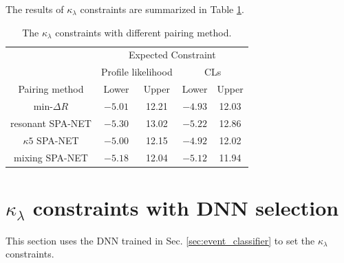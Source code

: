 \documentclass[12pt]{article}
\begin{document}
		The results of $\kappa_\lambda$ constraints are summarized in Table \ref{tab:kappa_constraint2}.
		\begin{table}[htpb]
			\centering
			\caption{The $\kappa_\lambda$ constraints with different pairing method.}
			\label{tab:kappa_constraint2}
			\begin{tabular}{c|cc|cc}
								  & \multicolumn{4}{c}{Expected Constraint}                          \\
								  & \multicolumn{2}{c}{Profile likelihood} & \multicolumn{2}{c}{CLs} \\ \hline
			Pairing method        & Lower              & Upper             & Lower      & Upper      \\ \hline
			$\text{min-}\Delta R$ & $-5.01$            & 12.21             & $-4.93$      & 12.03      \\
			resonant SPA-NET      & $-5.30$            & 13.02             & $-5.22$      & 12.86      \\
			$\kappa 5$ SPA-NET    & $-5.00$            & 12.15             & $-4.92$      & 12.02   \\
			mixing SPA-NET        & $-5.18$            & 12.04             & $-5.12$      & 11.94          
			\end{tabular}
		\end{table}
\section{\texorpdfstring{$\kappa_\lambda$}{kappa} constraints with DNN selection}%
\label{sec:kappa_constraints_with_dnn_selection}
	This section uses the DNN trained in Sec. \ref{sec:event_classifier} to set the $\kappa_\lambda$ constraints.
\end{document}
